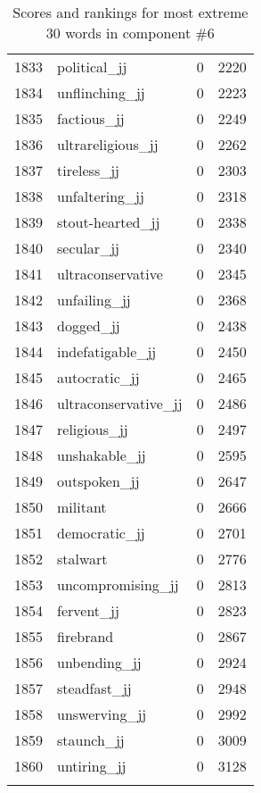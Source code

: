 \begin{longtable}[!htbp]{| rlr@{.}l |}
    1833 & political\_jj & 0 & 2220 \\
    1834 & unflinching\_jj & 0 & 2223 \\
    1835 & factious\_jj & 0 & 2249 \\
    1836 & ultrareligious\_jj & 0 & 2262 \\
    1837 & tireless\_jj & 0 & 2303 \\
    1838 & unfaltering\_jj & 0 & 2318 \\
    1839 & stout-hearted\_jj & 0 & 2338 \\
    1840 & secular\_jj & 0 & 2340 \\
    1841 & ultraconservative & 0 & 2345 \\
    1842 & unfailing\_jj & 0 & 2368 \\
    1843 & dogged\_jj & 0 & 2438 \\
    1844 & indefatigable\_jj & 0 & 2450 \\
    1845 & autocratic\_jj & 0 & 2465 \\
    1846 & ultraconservative\_jj & 0 & 2486 \\
    1847 & religious\_jj & 0 & 2497 \\
    1848 & unshakable\_jj & 0 & 2595 \\
    1849 & outspoken\_jj & 0 & 2647 \\
    1850 & militant & 0 & 2666 \\
    1851 & democratic\_jj & 0 & 2701 \\
    1852 & stalwart & 0 & 2776 \\
    1853 & uncompromising\_jj & 0 & 2813 \\
    1854 & fervent\_jj & 0 & 2823 \\
    1855 & firebrand & 0 & 2867 \\
    1856 & unbending\_jj & 0 & 2924 \\
    1857 & steadfast\_jj & 0 & 2948 \\
    1858 & unswerving\_jj & 0 & 2992 \\
    1859 & staunch\_jj & 0 & 3009 \\
    1860 & untiring\_jj & 0 & 3128 \\
    \hline
    \caption{Scores and rankings for most extreme 30 words in component \#6} \\
\end{longtable}
